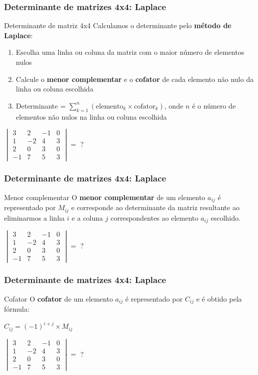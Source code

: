\documentclass[pdftex, brazil, aspectratio=169]{beamer}
\begin{document}
\begin{frame}[t]
  \frametitle{Determinante de matrizes 4x4: Laplace}
  \begin{block}{Determinante de matriz 4x4}
    Calculamos o determinante pelo \textbf{método de Laplace}:
    \begin{enumerate}
      \item Escolha uma linha ou coluna da matriz com o maior número de
        elementos nulos
      \item Calcule o \textbf{menor complementar} e o \textbf{cofator} de cada
        elemento não nulo da linha ou coluna escolhida
      \item Determinante = $\displaystyle \sum_{k=1}^n (\text{elemento}_k \times \text{cofator}_k)$,
        onde $n$ é o número de elementos não nulos na linha ou coluna escolhida
    \end{enumerate}
  \end{block}
  $\begin{vmatrix}
    3 & 2 & -1 & 0\\
    1 & -2 & 4 & 3\\
    2 & 0 & 3 & 0\\
    -1 & 7 & 5 & 3\end{vmatrix} =$ ?
\end{frame}

\begin{frame}[t]
  \frametitle{Determinante de matrizes 4x4: Laplace}
  \begin{block}{Menor complementar}
    O \textbf{menor complementar} de um elemento $a_{ij}$ é representado por
    $M_{ij}$ e corresponde ao determinante da matriz resultante ao eliminarmos 
    a linha $i$ e a coluna $j$ correspondentes ao elemento $a_{ij}$ escolhido.
  \end{block}
  $\begin{vmatrix}
    3 & 2 & -1 & 0\\
    1 & -2 & 4 & 3\\
    2 & 0 & 3 & 0\\
    -1 & 7 & 5 & 3\end{vmatrix} =$ ?
\end{frame}

\begin{frame}[t]
  \frametitle{Determinante de matrizes 4x4: Laplace}
  \begin{block}{Cofator}
    O \textbf{cofator} de um elemento $a_{ij}$ é representado por
    $C_{ij}$ e é obtido pela fórmula:
  \begin{center}
    $C_{ij} = (-1)^{i+j} \times M_{ij}$
  \end{center}
  \end{block}
  $\begin{vmatrix}
    3 & 2 & -1 & 0\\
    1 & -2 & 4 & 3\\
    2 & 0 & 3 & 0\\
    -1 & 7 & 5 & 3\end{vmatrix} =$ ?
\end{frame}
\end{document}
